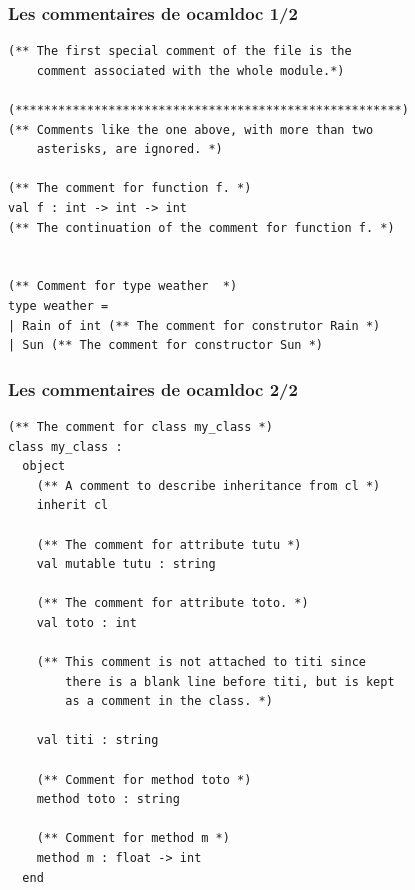 \begin{frame}[fragile]
	\frametitle{Les commentaires de ocamldoc 1/2}
	\lstset{basicstyle=\scriptsize}	
	\begin{lstlisting}
(** The first special comment of the file is the 
    comment associated with the whole module.*)

(******************************************************)
(** Comments like the one above, with more than two 
    asterisks, are ignored. *)

(** The comment for function f. *)
val f : int -> int -> int
(** The continuation of the comment for function f. *)


(** Comment for type weather  *)
type weather =
| Rain of int (** The comment for construtor Rain *)
| Sun (** The comment for constructor Sun *)
	\end{lstlisting}
\end{frame}

\begin{frame}[fragile]
	\frametitle{Les commentaires de ocamldoc 2/2}
	\lstset{basicstyle=\scriptsize}	
	\begin{lstlisting}
(** The comment for class my_class *)
class my_class :
  object
    (** A comment to describe inheritance from cl *)
    inherit cl

    (** The comment for attribute tutu *)
    val mutable tutu : string

    (** The comment for attribute toto. *)
    val toto : int

    (** This comment is not attached to titi since
        there is a blank line before titi, but is kept
        as a comment in the class. *)

    val titi : string

    (** Comment for method toto *)
    method toto : string

    (** Comment for method m *)
    method m : float -> int
  end
	\end{lstlisting}
\end{frame}

